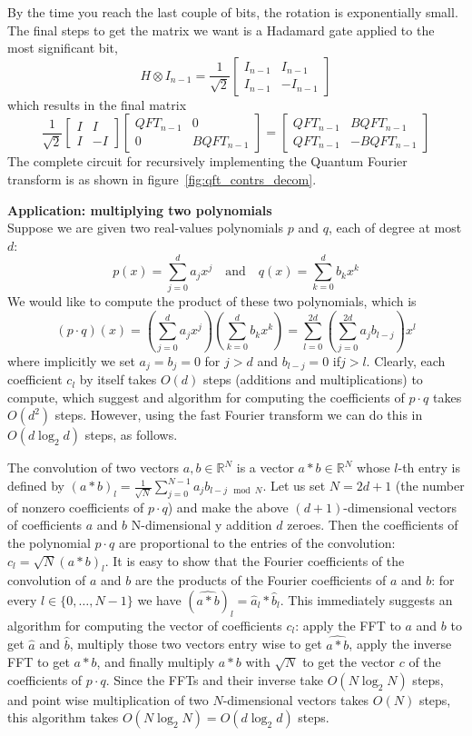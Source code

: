 By the time you reach the last couple of bits, the rotation is exponentially small. The final steps to get the matrix we want is a Hadamard gate applied to the most significant bit,
\[
H\otimes I_{n-1} = \frac{1}{\sqrt{2}}\begin{bmatrix}
    I_{n-1} & I_{n-1}\\
    I_{n-1} & -I_{n-1}
\end{bmatrix}
\]
which results in the final matrix
\[
\frac{1}{\sqrt{2}}\begin{bmatrix}
    I & I \\
    I & -I
\end{bmatrix}\begin{bmatrix}
    QFT_{n-1} & 0\\0& BQFT_{n-1}
\end{bmatrix} = \begin{bmatrix}
    QFT_{n-1} & BQFT_{n-1}\\
    QFT_{n-1} & -BQFT_{n-1}
\end{bmatrix}
\]
The complete circuit for recursively implementing the Quantum Fourier transform is as shown in figure~\ref{fig:qft_contrs_decom}.


\noindent \textbf{Application: multiplying two polynomials}\\
Suppose we are given two real-values polynomials $p$ and $q$, each of degree at most $d$:
\[
p(x)=\sum_{j=0}^d a_jx^j \quad \text{and} \quad q(x)=\sum_{k=0}^{d} b_kx^k
\]
We would like to compute the product of these two polynomials, which is
\[
(p\cdot q)(x)=\left(\sum_{j=0}^{d}a_jx^j\right)\left(\sum_{k=0}^d b_kx^k\right)=\sum_{l=0}^{2d}(\sum_{j=0}^{2d}a_jb_{l-j})x^l
\]
where implicitly we set $a_j=b_j=0$ for $j>d$ and $b_{l-j}=0$ if$j>l$. Clearly, each coefficient $c_l$ by itself takes $O(d)$ steps (additions and multiplications) to compute, which suggest and algorithm for computing the coefficients of $p\cdot q$ takes $O(d^2)$ steps. However, using the fast Fourier transform we can do this in $O(d\log_2 d)$ steps, as follows.

The convolution of two vectors $a,b\in\mathbb{R}^N$ is a vector $a*b\in\mathbb{R}^N$ whose $l$-th entry is defined by $(a*b)_l=\frac{1}{\sqrt{N}}\sum_{j=0}^{N-1}a_jb_{l-j\mod N}$. Let us set $N=2d+1$ (the number of nonzero coefficients of $p\cdot q$) and make the above $(d+1)$-dimensional vectors of coefficients $a$ and $b$ N-dimensional y addition $d$ zeroes. Then the coefficients of the polynomial $p\cdot q$ are proportional to the entries of the convolution: $c_l=\sqrt{N}(a*b)_l$. It is easy to show that the Fourier coefficients of the convolution of $a$ and $b$ are the products of the Fourier coefficients of $a$ and $b$: for every $l\in\{0,\ldots,N-1\}$ we have $(\hat{a*b})_l=\hat{a}_l*\hat{b}_l$. This immediately suggests an algorithm for computing the vector of coefficients $c_l$: apply the FFT to $a$ and $b$ to get $\hat{a}$ and $\hat{b}$, multiply those two vectors entry wise to get $\hat{a*b}$, apply the inverse FFT to get $a*b$, and finally multiply $a*b$ with $\sqrt{N}$ to get the vector $c$ of the coefficients of $p\cdot q$. Since the FFTs and their inverse take $O(N\log_2 N)$ steps, and point wise multiplication of two $N$-dimensional vectors takes $O(N)$ steps, this algorithm takes $O(N\log_2N)=O(d\log_2d)$ steps.

